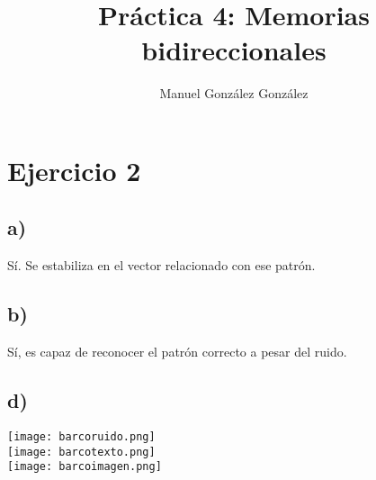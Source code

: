 \documentclass[12pt]{article}
\title{Práctica 4: Memorias bidireccionales}
\author{Manuel González González}
\begin{document}
\maketitle

\section*{Ejercicio 2}
\subsection*{a)}
Sí. Se estabiliza en el vector relacionado con ese patrón.
\subsection*{b)}
Sí, es capaz de reconocer el patrón correcto a pesar del ruido.
\subsection*{d)}
\texttt{[image: barcoruido.png]}\\
\texttt{[image: barcotexto.png]}\\
\texttt{[image: barcoimagen.png]}
\end{document}
